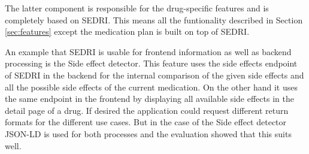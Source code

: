 The latter component is responsible for the drug-specific features and is completely based on SEDRI.
This means all the funtionality described in Section \ref{sec:features} except the medication plan is built on top of SEDRI.

An example that SEDRI is usable for frontend information as well as backend processing is the Side effect detector.
This feature uses the side effects endpoint of SEDRI in the backend for the internal comparison of the given side effects and all the possible side effects of the current medication.
On the other hand it uses the same endpoint in the frontend by displaying all available side effects in the detail page of a drug.
If desired the application could request different return formats for the different use cases.
But in the case of the Side effect detector JSON-LD is used for both processes and the evaluation showed that this suits well.
